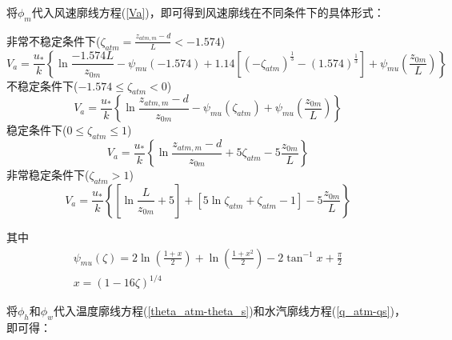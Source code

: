 将$\phi_m$代入风速廓线方程(\ref{Va})，即可得到风速廓线在不同条件下的具体形式：

\noindent 非常不稳定条件下($\zeta_{atm}=\frac{z_{atm,m}-d}{L}<-1.574$)
\begin{equation}\label{Va_VU}
V_{a}=\frac{u_{*}}{k}\left\{\ln \frac{-1.574 L}{z_{0 m}}-\psi_{mu}(-1.574)+
1.14\left[\left(-\zeta_{atm}\right)^{\frac{1}{3}}-(1.574)^{\frac{1}{3}}\right]+\psi_{mu}\left(\frac{z_{0 m}}{L}\right)\right\}
\end{equation}
不稳定条件下($-1.574\le\zeta_{atm}<0$)
\begin{equation}\label{Va_U}
V_{a}=\frac{u_{*}}{k}\left\{\ln \frac{z_{atm, m}-d}{z_{0 m}}-\psi_{mu}\left(\zeta_{atm}\right)+\psi_{mu}\left(\frac{z_{0 m}}{L}\right)\right\}
\end{equation}
稳定条件下($0\le\zeta_{atm}\le1$)
\begin{equation}\label{Va_S}
V_{a}=\frac{u_{*}}{k}\left\{\ln \frac{z_{atm, m}-d}{z_{0 m}}+5 \zeta_{atm}-5 \frac{z_{0 m}}{L}\right\}
\end{equation}
非常稳定条件下($\zeta_{atm}>1$)
\begin{equation}\label{Va_VS}
V_{a}=\frac{u_{*}}{k}\left\{\left[\ln \frac{L}{z_{0 m}}+5\right]+\left[5 \ln \zeta_{atm}+\zeta_{atm}-1\right]-5 \frac{z_{0 m}}{L}\right\}
\end{equation}

\noindent 其中
\begin{equation}\label{Psim}
\begin{array}{c}\psi_{mu}\left(\zeta\right)=2\ln{(\frac{1+x}{2})}+\ln{\left(\frac{1+x^2}{2}\right)-2}\tan^{-1}{x}+\frac{\pi}{2} \\
      x={(1-16\zeta)}^{1/4}\end{array}
\end{equation}

将$\phi_h$和$\phi_w$代入温度廓线方程(\ref{theta_atm-theta_s})和水汽廓线方程(\ref{q_atm-qs})，即可得：

